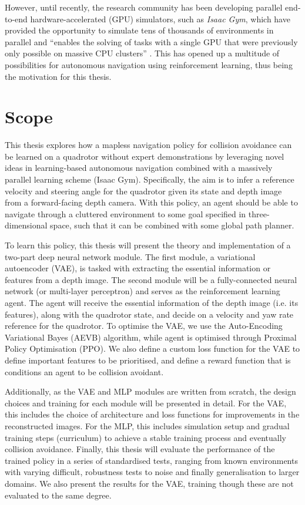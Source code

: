 However, until recently, the research community has been developing parallel end-to-end hardware-accelerated (GPU) simulators, such as \textit{Isaac Gym}, which have provided the opportunity to simulate tens of thousands of environments in parallel and ``enables the solving of tasks with a single GPU that were previously only possible on massive CPU clusters'' \cite{IsaacGym}. This has opened up a multitude of possibilities for autonomous navigation using reinforcement learning, thus being the motivation for this thesis.


\section{Scope}
This thesis explores how a mapless navigation policy for collision avoidance can be learned on a quadrotor without expert demonstrations by leveraging novel ideas in learning-based autonomous navigation combined with a massively parallel learning scheme (Isaac Gym). 
Specifically, the aim is to infer a reference velocity and steering angle for the quadrotor given its state and depth image from a forward-facing depth camera. With this policy, an agent should be able to navigate through a cluttered environment to some goal specified in three-dimensional space, such that it can be combined with some global path planner.

To learn this policy, this thesis will present the theory and implementation of a two-part deep neural network module. The first module, a variational autoencoder (VAE), is tasked with extracting the essential information or features from a depth image. The second module will be a fully-connected neural network (or multi-layer perceptron) and serves as the reinforcement learning agent. The agent will receive the essential information of the depth image (i.e. its features), along with the quadrotor state, and decide on a velocity and yaw rate reference for the quadrotor. To optimise the VAE, we use the Auto-Encoding Variational Bayes (AEVB) algorithm, while agent is optimised through Proximal Policy Optimisation (PPO). We also define a custom loss function for the VAE to define important features to be prioritised, and define a reward function that is conditions an agent to be collision avoidant.

Additionally, as the VAE and MLP modules are written from scratch, the design choices and training for each module will be presented in detail. 
For the VAE, this includes the choice of architecture and loss functions for improvements in the reconstructed images.
For the MLP, this includes simulation setup and gradual training steps (curriculum) to achieve a stable training process and eventually collision avoidance.
Finally, this thesis will evaluate the performance of the trained policy in a series of standardised tests, ranging from known environments with varying difficult, robustness tests to noise and finally generalisation to larger domains. We also present the results for the VAE, training though these are not evaluated to the same degree.


